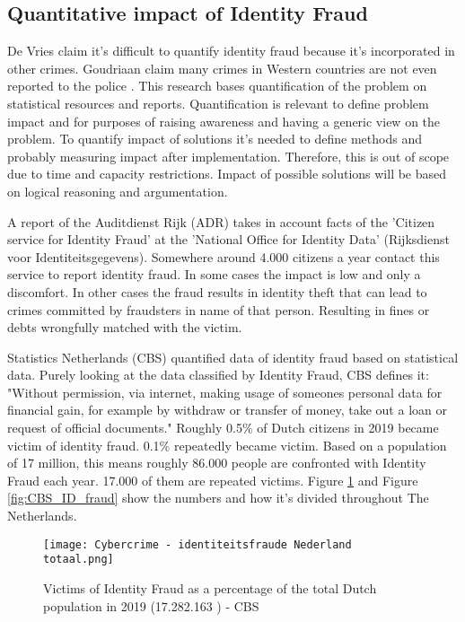 \subsection{Quantitative impact of Identity Fraud}\label{QI}
De Vries \etal claim it's difficult to quantify identity fraud because it's incorporated in other crimes\cite{Vries2007IdentiteitsfraudeEA}. Goudriaan \etal claim many crimes in Western countries are not even reported to the police \cite{Gourdriaan_etal}. This research bases quantification of the problem on statistical resources and reports. Quantification is relevant to define problem impact and for purposes of raising awareness and having a generic view on the problem. To quantify impact of solutions it's needed to define methods and probably measuring impact after implementation. Therefore, this is out of scope due to time and capacity restrictions. Impact of possible solutions will be based on logical reasoning and argumentation.

A report of the Auditdienst Rijk (ADR)\cite{ADR} takes in account facts of the 'Citizen service for Identity Fraud' at the 'National Office for Identity Data' (Rijksdienst voor Identiteitsgegevens). Somewhere around 4.000 citizens a year contact this service to report identity fraud. In some cases the impact is low and only a discomfort. In other cases the fraud results in identity theft that can lead to crimes committed by fraudsters in name of that person. Resulting in fines or debts wrongfully matched with the victim.\par 
Statistics Netherlands (CBS) quantified data of identity fraud based on statistical data. Purely looking at the data classified by Identity Fraud, CBS defines it: "Without permission, via internet, making usage of someones personal data for financial gain, for example by withdraw or transfer of money, take out a loan or request of official documents." Roughly 0.5\% of Dutch citizens in 2019 became victim of identity fraud. 0.1\% repeatedly became victim. Based on a population of 17 million, this means roughly 86.000 people are confronted with Identity Fraud each year. 17.000 of them are repeated victims. Figure \ref{fig:CBS_Total_ID_fraud} and Figure \ref{fig:CBS_ID_fraud} show the numbers and how it's divided throughout The Netherlands.

\graphicspath{ {./images/} }
\begin{figure}
\texttt{[image: Cybercrime - identiteitsfraude Nederland totaal.png]}\\
\caption{Victims of Identity Fraud \cite{CBS_IDFraudTable} as a percentage of the total Dutch population in 2019 (17.282.163 \cite{CBS_totalpopulation2019}) - CBS}  
\label{fig:CBS_Total_ID_fraud}
\end{figure}

